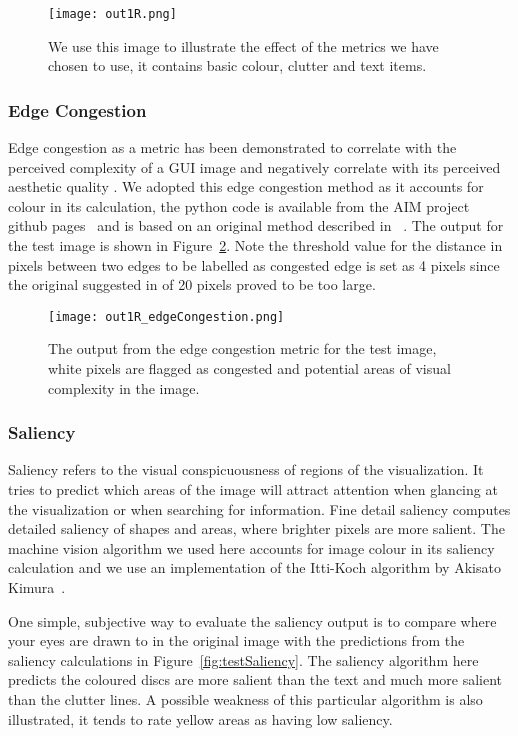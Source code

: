 \begin{figure}[htb]
  \centering
  \texttt{[image: out1R.png]}
  \caption{\label{fig:testImage}
           We use this image to illustrate the effect of the metrics we have chosen to use, it contains basic colour, clutter and text items.}
\end{figure}

\subsubsection{Edge Congestion}
Edge congestion as a metric has been demonstrated to correlate with the perceived complexity of a GUI image and negatively correlate with its perceived aesthetic quality \cite{miniukovich2014}. We adopted this edge congestion method as it accounts for colour in its calculation, the python code is available from the AIM project github pages~\cite{Oulasvirta:2018} and is based on an original method described in ~\cite{rosenholtz2007}. The output for the test image is shown in Figure~\ref{fig:testCongestion}. Note the threshold value for the distance in pixels between two edges to be labelled as congested edge is set as 4 pixels since the original suggested in \cite{miniukovich2014} of 20 pixels proved to be too large. 

\begin{figure}[htb]
  \centering
  \texttt{[image: out1R\_edgeCongestion.png]}
  \caption{\label{fig:testCongestion}
           The output from the edge congestion metric for the test image, white pixels are flagged as congested and potential areas of visual complexity in the image.}
\end{figure}


\subsubsection{Saliency}
Saliency refers to the visual conspicuousness of regions of the visualization. It tries to predict which areas of the image will attract attention when glancing 
at the visualization or when searching for information. Fine detail saliency \cite{itti2000} computes detailed saliency of shapes and areas, where brighter pixels are more salient. The machine vision algorithm we used here accounts for image colour in its saliency calculation and we use an implementation of the Itti-Koch algorithm by Akisato Kimura~\cite{Oulasvirta:2018}.

One simple, subjective way to evaluate the saliency output is to compare where your eyes are drawn to in the original image with the predictions from the saliency calculations in Figure~\ref{fig:testSaliency}. The saliency algorithm here predicts the coloured discs are more salient than the text and much more salient than the clutter lines. A possible weakness of this particular algorithm is also illustrated, it tends to rate yellow areas as having low saliency.

